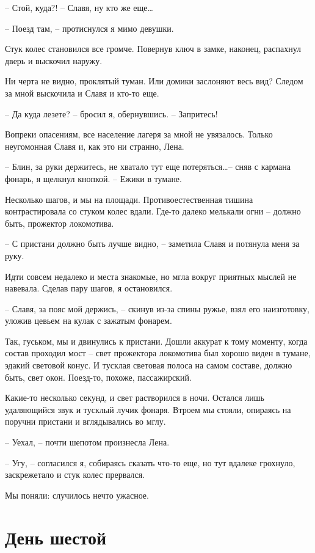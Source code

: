 \documentclass[a4paper]{book}
\begin{document}
-- Стой, куда?! -- Славя, ну кто же еще\ldots 

-- Поезд там, -- протиснулся я мимо девушки. 

Стук колес становился все громче. Повернув ключ в замке, наконец, распахнул дверь и выскочил наружу. 

Ни черта не видно, проклятый туман. Или домики заслоняют весь вид? Следом за мной выскочила и Славя и кто-то еще.

-- Да куда лезете? -- бросил я, обернувшись. -- Запритесь!

Вопреки опасениям, все население лагеря за мной не увязалось. Только неугомонная Славя и, как это ни странно, Лена.

-- Блин, за руки держитесь, не хватало тут еще потеряться\ldots -- сняв с кармана фонарь, я щелкнул кнопкой. -- Ежики в тумане.

Несколько шагов, и мы на площади. Противоестественная тишина контрастировала со стуком колес вдали. Где-то далеко мелькали огни -- должно быть, прожектор локомотива.

-- С пристани должно быть лучше видно, -- заметила Славя и потянула меня за руку. 

Идти совсем недалеко и места знакомые, но мгла вокруг приятных мыслей не навевала. Сделав пару шагов, я остановился. 

-- Славя, за пояс мой держись, -- скинув из-за спины ружье, взял его наизготовку, уложив цевьем на кулак с зажатым фонарем.

Так, гуськом, мы и двинулись к пристани. Дошли аккурат к тому моменту, когда состав проходил мост -- свет прожектора локомотива был хорошо виден в тумане, эдакий световой конус. И тусклая световая полоса на самом составе, должно быть, свет окон. Поезд-то, похоже, пассажирский. 

Какие-то несколько секунд, и свет растворился в ночи. Остался лишь удаляющийся звук и тусклый лучик фонаря. Втроем мы стояли, опираясь на поручни пристани и вглядывались во мглу. 

-- Уехал, -- почти шепотом произнесла Лена.

-- Угу, -- согласился я, собираясь сказать что-то еще, но тут вдалеке  грохнуло, заскрежетало и стук колес прервался. 

Мы поняли: случилось нечто ужасное.

\chapter{День шестой}
\end{document}
